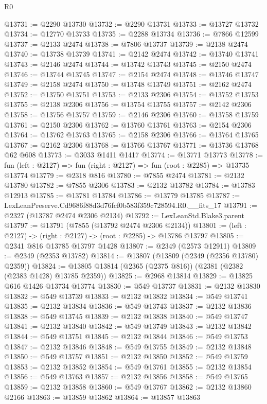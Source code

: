 \begin{lexlean}{R0}
\begin{coremodule}
@13731 := @2290 @13730
@13732 := @2290 @13731
@13733 := @13727 @13732
@13734 := @12770 @13733
@13735 := @2288 @13734
@13736 := @7866 @12599
@13737 := @2133 @2474
@13738 := @7806 @13737
@13739 := @2138 @2474
@13740 := @13738 @13739
@13741 := @2142 @2474
@13742 := @13740 @13741
@13743 := @2146 @2474
@13744 := @13742 @13743
@13745 := @2150 @2474
@13746 := @13744 @13745
@13747 := @2154 @2474
@13748 := @13746 @13747
@13749 := @2158 @2474
@13750 := @13748 @13749
@13751 := @2162 @2474
@13752 := @13750 @13751
@13753 := @2133 @2306
@13754 := @13752 @13753
@13755 := @2138 @2306
@13756 := @13754 @13755
@13757 := @2142 @2306
@13758 := @13756 @13757
@13759 := @2146 @2306
@13760 := @13758 @13759
@13761 := @2150 @2306
@13762 := @13760 @13761
@13763 := @2154 @2306
@13764 := @13762 @13763
@13765 := @2158 @2306
@13766 := @13764 @13765
@13767 := @2162 @2306
@13768 := @13766 @13767
@13771 := @13736 @13768 @62 @608
@13773 := @3033 @1411 @1417
@13774 := @13771 @13773
@13778 := fun (left : @2127) => fun (right : @2127) => fun (root : @2285) => @13735 @13774
@13779 := @2318 @816
@13780 := @7855 @2474
@13781 := @2132 @13780
@13782 := @7855 @2306
@13783 := @2132 @13782
@13784 := @13783 @12913
@13785 := @13781 @13784
@13786 := @13779 @13785
@13787 := LexLeanPreserve.Cd9686f88d3d76fcf0b583f359c728594.R0.__fits_17
@13791 := @2327 (@13787 @2474 @2306 @2134)
@13792 := LexLeanStd.Blake3.parent
@13797 := @13791 (@7855 (@13792 @2474 @2306 @2134))
@13801 := (left : @2127) -> (right : @2127) -> (root : @2285) -> @13786 @13797
@13805 := @2341 @816 @13785 @13797 @1428
@13807 := @2349 (@2573 @12911)
@13809 := @2349 (@2353 @13782)
@13814 := @13807 (@13809 (@2349 (@2356 @13780) @2359))
@13824 := @13805 @13814 (@2365 (@2375 @816)) (@2381 (@2382 (@2383 @1428) @13785 @2359))
@13825 := @2968 @13814
@13829 := @13825 @616 @1426 @13734 @13774
@13830 := @549 @13737
@13831 := @2132 @13830
@13832 := @549 @13739
@13833 := @2132 @13832
@13834 := @549 @13741
@13835 := @2132 @13834
@13836 := @549 @13743
@13837 := @2132 @13836
@13838 := @549 @13745
@13839 := @2132 @13838
@13840 := @549 @13747
@13841 := @2132 @13840
@13842 := @549 @13749
@13843 := @2132 @13842
@13844 := @549 @13751
@13845 := @2132 @13844
@13846 := @549 @13753
@13847 := @2132 @13846
@13848 := @549 @13755
@13849 := @2132 @13848
@13850 := @549 @13757
@13851 := @2132 @13850
@13852 := @549 @13759
@13853 := @2132 @13852
@13854 := @549 @13761
@13855 := @2132 @13854
@13856 := @549 @13763
@13857 := @2132 @13856
@13858 := @549 @13765
@13859 := @2132 @13858
@13860 := @549 @13767
@13862 := @2132 @13860 @2166
@13863 := @13859 @13862
@13864 := @13857 @13863

\end{coremodule}
\end{lexlean}
